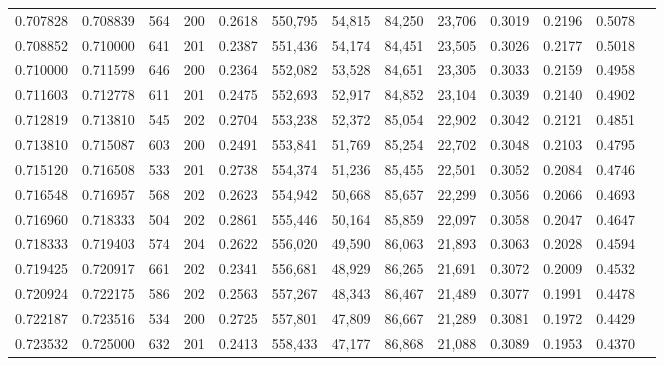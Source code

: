\begin{tabular}{rrrrrrrrrrrrr}
0.707828 & 0.708839 &    564 &   200 &                                     0.2618 & 550,795 &  54,815 &  84,250 &  23,706 & 0.3019 & 0.2196 & 0.5078 \\
0.708852 & 0.710000 &    641 &   201 &                                     0.2387 & 551,436 &  54,174 &  84,451 &  23,505 & 0.3026 & 0.2177 & 0.5018 \\
0.710000 & 0.711599 &    646 &   200 &                                     0.2364 & 552,082 &  53,528 &  84,651 &  23,305 & 0.3033 & 0.2159 & 0.4958 \\
0.711603 & 0.712778 &    611 &   201 &                                     0.2475 & 552,693 &  52,917 &  84,852 &  23,104 & 0.3039 & 0.2140 & 0.4902 \\
0.712819 & 0.713810 &    545 &   202 &                                     0.2704 & 553,238 &  52,372 &  85,054 &  22,902 & 0.3042 & 0.2121 & 0.4851 \\
0.713810 & 0.715087 &    603 &   200 &                                     0.2491 & 553,841 &  51,769 &  85,254 &  22,702 & 0.3048 & 0.2103 & 0.4795 \\
0.715120 & 0.716508 &    533 &   201 &                                     0.2738 & 554,374 &  51,236 &  85,455 &  22,501 & 0.3052 & 0.2084 & 0.4746 \\
0.716548 & 0.716957 &    568 &   202 &                                     0.2623 & 554,942 &  50,668 &  85,657 &  22,299 & 0.3056 & 0.2066 & 0.4693 \\
0.716960 & 0.718333 &    504 &   202 &                                     0.2861 & 555,446 &  50,164 &  85,859 &  22,097 & 0.3058 & 0.2047 & 0.4647 \\
0.718333 & 0.719403 &    574 &   204 &                                     0.2622 & 556,020 &  49,590 &  86,063 &  21,893 & 0.3063 & 0.2028 & 0.4594 \\
0.719425 & 0.720917 &    661 &   202 &                                     0.2341 & 556,681 &  48,929 &  86,265 &  21,691 & 0.3072 & 0.2009 & 0.4532 \\
0.720924 & 0.722175 &    586 &   202 &                                     0.2563 & 557,267 &  48,343 &  86,467 &  21,489 & 0.3077 & 0.1991 & 0.4478 \\
0.722187 & 0.723516 &    534 &   200 &                                     0.2725 & 557,801 &  47,809 &  86,667 &  21,289 & 0.3081 & 0.1972 & 0.4429 \\
0.723532 & 0.725000 &    632 &   201 &                                     0.2413 & 558,433 &  47,177 &  86,868 &  21,088 & 0.3089 & 0.1953 & 0.4370 \\

\end{tabular}
